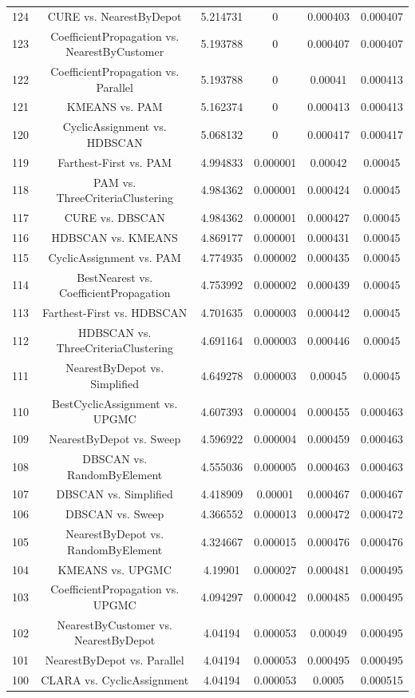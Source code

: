 \documentclass[a4paper,10pt]{article}
\begin{document}
\begin{landscape}
\begin{table}[!htp]
\begin{tabular}{cccccc}
124&CURE vs. NearestByDepot&5.214731&0&0.000403&0.000407\\
123&CoefficientPropagation vs. NearestByCustomer&5.193788&0&0.000407&0.000407\\
122&CoefficientPropagation vs. Parallel&5.193788&0&0.00041&0.000413\\
121&KMEANS vs. PAM&5.162374&0&0.000413&0.000413\\
120&CyclicAssignment vs. HDBSCAN&5.068132&0&0.000417&0.000417\\
119&Farthest-First vs. PAM&4.994833&0.000001&0.00042&0.00045\\
118&PAM vs. ThreeCriteriaClustering&4.984362&0.000001&0.000424&0.00045\\
117&CURE vs. DBSCAN&4.984362&0.000001&0.000427&0.00045\\
116&HDBSCAN vs. KMEANS&4.869177&0.000001&0.000431&0.00045\\
115&CyclicAssignment vs. PAM&4.774935&0.000002&0.000435&0.00045\\
114&BestNearest vs. CoefficientPropagation&4.753992&0.000002&0.000439&0.00045\\
113&Farthest-First vs. HDBSCAN&4.701635&0.000003&0.000442&0.00045\\
112&HDBSCAN vs. ThreeCriteriaClustering&4.691164&0.000003&0.000446&0.00045\\
111&NearestByDepot vs. Simplified&4.649278&0.000003&0.00045&0.00045\\
110&BestCyclicAssignment vs. UPGMC&4.607393&0.000004&0.000455&0.000463\\
109&NearestByDepot vs. Sweep&4.596922&0.000004&0.000459&0.000463\\
108&DBSCAN vs. RandomByElement&4.555036&0.000005&0.000463&0.000463\\
107&DBSCAN vs. Simplified&4.418909&0.00001&0.000467&0.000467\\
106&DBSCAN vs. Sweep&4.366552&0.000013&0.000472&0.000472\\
105&NearestByDepot vs. RandomByElement&4.324667&0.000015&0.000476&0.000476\\
104&KMEANS vs. UPGMC&4.19901&0.000027&0.000481&0.000495\\
103&CoefficientPropagation vs. UPGMC&4.094297&0.000042&0.000485&0.000495\\
102&NearestByCustomer vs. NearestByDepot&4.04194&0.000053&0.00049&0.000495\\
101&NearestByDepot vs. Parallel&4.04194&0.000053&0.000495&0.000495\\
100&CLARA vs. CyclicAssignment&4.04194&0.000053&0.0005&0.000515\\

\end{tabular}
\end{table}
\end{landscape}
\end{document}
